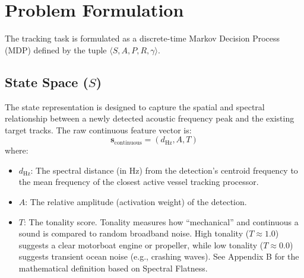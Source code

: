 \documentclass[12pt,a4paper]{article}
\begin{document}
\section{Problem Formulation}
The tracking task is formulated as a discrete-time Markov Decision Process (MDP) defined by the tuple $\langle S, A, P, R, \gamma \rangle$.

\subsection{State Space ($S$)}
The state representation is designed to capture the spatial and spectral relationship between a newly detected acoustic frequency peak and the existing target tracks. The raw continuous feature vector is:
\begin{equation}
    \mathbf{s}_{\text{continuous}} = (d_{\text{Hz}}, A, T)
\end{equation}
where:
\begin{itemize}
    \item $d_{\text{Hz}}$: The spectral distance (in Hz) from the detection's centroid frequency to the mean frequency of the closest active vessel tracking processor.
    \item $A$: The relative amplitude (activation weight) of the detection.
    \item $T$: The tonality score. Tonality measures how ``mechanical'' and continuous a sound is compared to random broadband noise. High tonality ($T \approx 1.0$) suggests a clear motorboat engine or propeller, while low tonality ($T \approx 0.0$) suggests transient ocean noise (e.g., crashing waves). See Appendix B for the mathematical definition based on Spectral Flatness.
\end{itemize}
\end{document}
